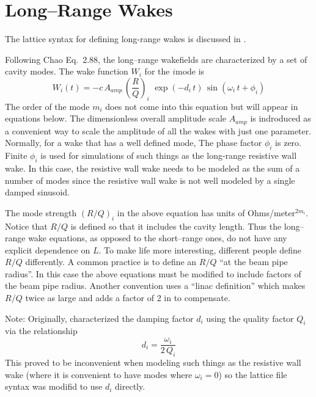 \section{Long--Range Wakes}
\label{s:lr.wake.eq}

The lattice syntax for defining long-range wakes is discussed in .

Following Chao\cite{b:chao} Eq.~2.88, the long--range wakefields are characterized by a set of
cavity modes. The wake function $W_i$ for the $i$\Th mode is
\begin{equation}
  W_i(t) = -c \, A_{amp} \, \left( \frac{R}{Q} \right)_i \,\,
  \exp(-d_i \, t) \, \sin (\omega_i \, t + \phi_i)
  \label{wcrq}
\end{equation}
The order of the mode $m_i$ does not come into this equation but will appear in equations below.
The dimensionless overall amplitude scale $A_{amp}$ is indroduced as a convenient way to scale the
amplitude of all the wakes with just one parameter. Normally, for a wake that has a well defined
mode, The phase factor $\phi_i$ is zero. Finite $\phi_i$ is used for simulations of such things as
the long-range resistive wall wake. In this case, the resistive wall wake needs to be modeled as the
sum of a number of modes since the resistive wall wake is not well modeled by a single damped
sinusoid.

The mode strength $(R/Q)_i$ in the above equation has units of Ohms/meter$^{2m_i}$. Notice that
$R/Q$ is defined so that it includes the cavity length. Thus the long--range wake equations, as
opposed to the short--range ones, do not have any explicit dependence on $L$. To make life more
interesting, different people define $R/Q$ differently. A common practice is to define an $R/Q$ ``at
the beam pipe radius''. In this case the above equations must be modified to include factors of the
beam pipe radius. Another convention uses a ``linac definition'' which makes $R/Q$ twice as large
and adds a factor of 2 in  to compensate.

Note: Originally, \bmad characterized the damping factor $d_i$ using the quality factor $Q_i$ via the
relationship
\begin{equation}
  d_i = \frac{\omega_i}{2 \, Q_i}
  \label{do2q}
\end{equation}
This proved to be inconvenient when modeling such things as the resistive wall wake (where it is convenient
to have modes where $\omega_i = 0$) so the lattice file syntax was modifid to use $d_i$ directly.

